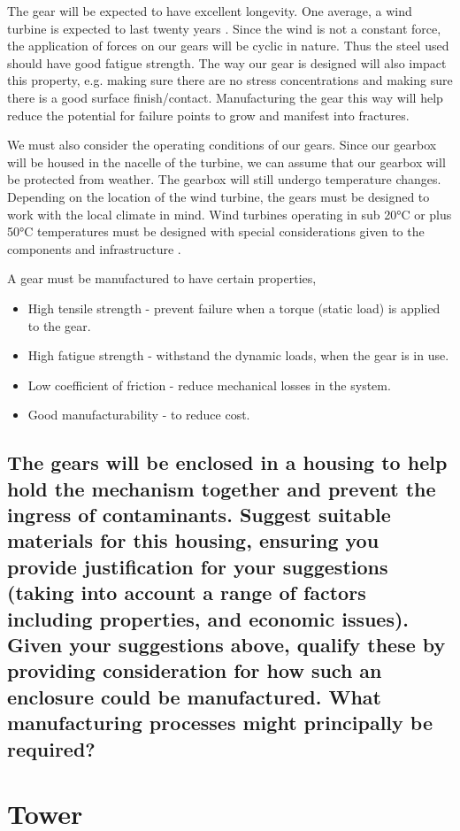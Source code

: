 \documentclass[12pt]{article}
\numberwithin{equation}{section}
\begin{document}
\begin{flushleft}
The gear will be expected to have excellent longevity. One average, a wind turbine is expected to last twenty years \citep{windTurbineLifetime}. Since the wind is not a constant force, the application of forces on our gears will be cyclic in nature. Thus the steel used should have good fatigue strength. The way our gear is designed will also impact this property, e.g. making sure there are no stress concentrations and making sure there is a good surface finish/contact. Manufacturing the gear this way will help reduce the potential for failure points to grow and manifest into fractures. 

We must also consider the operating conditions of our gears. Since our gearbox will be housed in the nacelle of the turbine, we can assume that our gearbox will be protected from weather. The gearbox will still undergo temperature changes. Depending on the location of the wind turbine, the gears must be designed to work with the local climate in mind. Wind turbines operating in sub 20\si{\celsius} or plus 50\si{\celsius} temperatures must be designed with special considerations given to the components and infrastructure \citep{windTurbineOperatingConditions}.

A gear must be manufactured to have certain properties,
\begin{itemize}
  \item High tensile strength - prevent failure when a torque (static load) is applied to the gear.
  \item High fatigue strength - withstand the dynamic loads, when the gear is in use.
  \item Low coefficient of friction - reduce mechanical losses in the system.
  \item Good manufacturability - to reduce cost.
\end{itemize}
\subsection{The gears will be enclosed in a housing to help hold the mechanism together and prevent the ingress of contaminants. Suggest suitable materials for this housing, ensuring you provide justification for your suggestions (taking into account a range of factors including properties, and economic issues). Given your suggestions above, qualify these by providing consideration for how such an enclosure could be manufactured. What manufacturing processes might principally be required?}

\section{Tower}

\end{flushleft}
\end{document}
